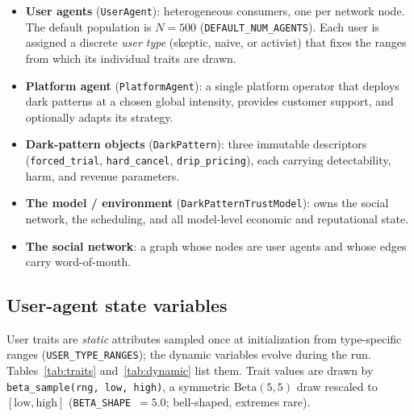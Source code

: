 \documentclass[11pt]{article}
\newcommand{\code}[1]{\texttt{#1}}
\begin{document}
\begin{itemize}
  \item \textbf{User agents} (\code{UserAgent}): heterogeneous consumers, one
  per network node. The default population is $N = 500$ (\code{DEFAULT\_NUM\_AGENTS}).
  Each user is assigned a discrete \emph{user type} (skeptic, naive, or activist)
  that fixes the ranges from which its individual traits are drawn.
  \item \textbf{Platform agent} (\code{PlatformAgent}): a single platform
  operator that deploys dark patterns at a chosen global intensity, provides
  customer support, and optionally adapts its strategy.
  \item \textbf{Dark-pattern objects} (\code{DarkPattern}): three immutable
  descriptors (\code{forced\_trial}, \code{hard\_cancel}, \code{drip\_pricing}),
  each carrying detectability, harm, and revenue parameters.
  \item \textbf{The model / environment} (\code{DarkPatternTrustModel}):
  owns the social network, the scheduling, and all model-level economic and
  reputational state.
  \item \textbf{The social network}: a graph whose nodes are user agents and
  whose edges carry word-of-mouth.
\end{itemize}

\subsection{User-agent state variables}

User traits are \emph{static} attributes sampled once at initialization from
type-specific ranges (\code{USER\_TYPE\_RANGES}); the dynamic variables evolve
during the run. Tables~\ref{tab:traits} and~\ref{tab:dynamic} list them.
Trait values are drawn by \code{beta\_sample(rng, low, high)}, a symmetric
$\mathrm{Beta}(5,5)$ draw rescaled to $[\text{low}, \text{high}]$
(\code{BETA\_SHAPE}~$=5.0$; bell-shaped, extremes rare).
\end{document}
